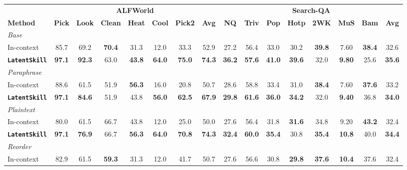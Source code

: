 \documentclass{llmxive}
\providecommand{\best}[1]{\textbf{#1}}
\providecommand{\textttt}[1]{\texttt{#1}}
\providecommand{\method}{\textbf{\textttt{LatentSkill}}}
\providecommand{\arraystretch}{1.05}
\begin{document}
\begin{table}[!t]
\vspace{-450pt}
\centering
\small
\setlength{\tabcolsep}{4pt}
\renewcommand{\arraystretch}{1.05}
\begin{tabular}{
  l
  cccccc c
  ccccccc c
}
\toprule
& \multicolumn{7}{c}{\textbf{ALFWorld}}
& \multicolumn{8}{c}{\textbf{Search-QA}} \\
\cmidrule(lr){2-8}\cmidrule(lr){9-16}
\textbf{Method}
  & \textbf{Pick} & \textbf{Look} & \textbf{Clean}
  & \textbf{Heat} & \textbf{Cool} & \textbf{Pick2}
  & \textbf{Avg}
  & \textbf{NQ} & \textbf{Triv} & \textbf{Pop}
  & \textbf{Hotp} & \textbf{2WK} & \textbf{MuS} & \textbf{Bam}
  & \textbf{Avg} \\
\midrule
\multicolumn{16}{l}{\emph{Base}} \\
In-context & 85.7 & 69.2 & \best{70.4} & 31.3 & 12.0 & 33.3 & 52.9
  & 27.2 & 56.4 & 33.0 & 30.2 & \best{39.8} & 7.60 & \best{38.4} & 32.6 \\
\rowcolor{ourblue}
\method{} & \best{97.1} & \best{92.3} & 63.0 & \best{43.8} & \best{64.0} & \best{75.0} & \best{74.3}
  & \best{36.2} & \best{57.6} & \best{41.0} & \best{39.6} & 32.0 & \best{9.80} & 25.6 & \best{35.6} \\
\midrule
\multicolumn{16}{l}{\emph{Paraphrase}} \\
In-context & 88.6 & 61.5 & 51.9 & \best{56.3} & 16.0 & 20.8 & 50.7
  & 28.6 & 58.8 & 33.4 & 31.0 & \best{38.4} & 7.60 & \best{37.6} & 33.2 \\
\rowcolor{ourblue}
\method{} & \best{97.1} & \best{84.6} & 51.9 & 43.8 & \best{56.0} & \best{62.5} & \best{67.9}
  & \best{29.8} & \best{61.6} & \best{36.0} & \best{34.2} & 32.0 & \best{9.40} & 36.8 & \best{34.0} \\
\midrule
\multicolumn{16}{l}{\emph{Plaintext}} \\
In-context & 80.0 & 61.5 & 66.7 & 43.8 & 12.0 & 25.0 & 50.0
  & 27.6 & 56.4 & 31.8 & \best{31.6} & 34.8 & 9.20 & \best{43.2} & 32.4 \\
\rowcolor{ourblue}
\method{} & \best{97.1} & \best{76.9} & 66.7 & \best{56.3} & \best{64.0} & \best{70.8} & \best{74.3}
  & \best{32.4} & \best{60.0} & \best{35.4} & 30.8 & \best{35.4} & \best{10.8} & 40.0 & \best{34.4} \\
\midrule
\multicolumn{16}{l}{\emph{Reorder}} \\
In-context & 82.9 & 61.5 & \best{59.3} & 31.3 & 12.0 & 41.7 & 50.7
  & 27.6 & 56.6 & 30.8 & \best{29.8} & \best{37.6} & \best{10.4} & 37.6 & 32.4 \\

\end{tabular}
\end{table}
\end{document}
